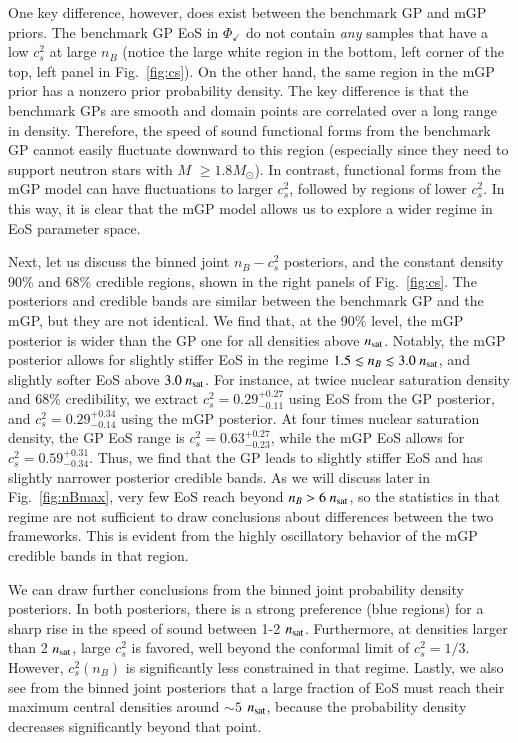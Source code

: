\documentclass[aps,prd,nofootinbib,tightenlines,notitlepage,floatfix,superscriptaddress,showkeys,twocolumn]{revtex4-1}
\begin{document}
One key difference, however, does exist between the benchmark GP and mGP priors. The benchmark GP EoS in $\Phi_\checkmark$ do not contain
\emph{any} samples that have a low $c_s^2$ at large $n_B$ (notice the large white region in the bottom, left corner of the top, left panel in Fig.~\ref{fig:cs}). On the other hand, the same region in the mGP prior has a nonzero prior probability density. The key difference is that the benchmark GPs are smooth and domain points are correlated over a long range in density. Therefore, the speed of sound functional forms from the benchmark GP cannot easily fluctuate downward to this region (especially since they need to support neutron stars with $M$ $\geq 1.8 M_\odot$). In contrast, functional forms from the mGP model can have fluctuations to larger $c_s^2$, followed by regions of lower $c_s^2$. In this way, it is clear that the mGP model allows us to explore a wider regime in EoS parameter space.  

Next, let us discuss the binned joint $n_B-c_s^2$ posteriors, and the constant density 90\% and 68\% credible regions, shown in the right panels of Fig.~\ref{fig:cs}. The posteriors and credible bands are similar between the benchmark GP and the mGP, but they are not identical. We find that, at the 90\% level, the mGP posterior is wider than the GP one for all densities above $n_{\rm sat}$. Notably, the mGP posterior allows for slightly stiffer EoS in the regime $1.5 \lesssim n_B \lesssim 3.0\ n_{\rm sat}$, and slightly softer EoS above $3.0\ n_{\rm sat}$. For instance, at twice nuclear saturation density and 68\% credibility, we extract $c^2_s =0.29^{+0.27}_{-0.11}$ using EoS from the GP posterior, and $c^2_s =0.29^{+0.34}_{-0.14}$ using the mGP posterior. At four times nuclear saturation density, the GP EoS range is $c^2_s =0.63^{+0.27}_{-0.23}$, while the mGP EoS allows for $c^2_s =0.59^{+0.31}_{-0.34}$. Thus, we find that the GP leads to slightly stiffer EoS and has slightly narrower posterior credible bands. As we will discuss later in Fig.~\ref{fig:nBmax}, very few EoS reach beyond $n_B > 6\ n_{\rm sat}$, so the statistics in that regime are not sufficient to draw conclusions about differences between the two frameworks. This is evident from the highly oscillatory behavior of the mGP credible bands in that region.

We can draw further conclusions from the binned joint probability density posteriors. In both posteriors, there is a strong preference (blue regions) for a sharp rise in the speed of sound between 1-2 $n_{\rm sat}$. Furthermore, at densities larger than 2 $n_{\rm sat}$, large $c_s^2$ is favored, well beyond the conformal limit of $c_s^2=1/3$.  However, $c_s^2(n_B)$ is significantly less constrained in that regime. Lastly, we also see from the binned joint posteriors that a large fraction of EoS must reach their maximum central densities around $\sim 5$ $n_{\rm sat}$, because the probability density decreases significantly beyond that point.  
\end{document}
